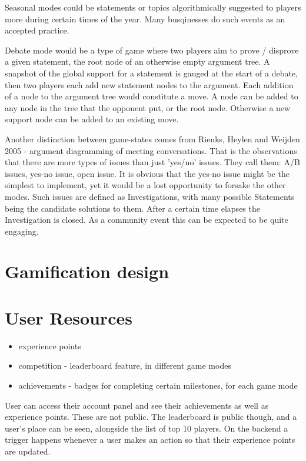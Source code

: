 \documentclass{article}
\begin{document}
Seasonal modes could be statements or topics algorithmically suggested to players more during certain times of the year. Many busqinesses do such events as an accepted practice.

Debate mode would be a type of game where two players aim to prove / disprove a given statement, the root node of an otherwise empty argument tree.  A snapshot of the global support for a statement is gauged at the start of a debate, then two players each add new statement nodes to the argument. Each addition of a node to the argument tree would constitute a move.
A node can be added to any node in the tree that the opponent put, or the root node. Otherwise a new support node can be added to an existing move.

Another distinction between game-states comes from Rienks, Heylen and Weijden 2005 - argument diagramming of meeting conversations. That is the observations that there are more types of issues than just 'yes/no' issues. They call them: A/B issues, yes-no issue, open issue. It is obvious that the yes-no issue might be the simplest to implement, yet it would be a lost opportunity to forsake the other modes.
Such issues are defined as Investigations, with many possible Statements being the candidate solutions to them. After a certain time elapses the Investigation is closed. As a community event this can be expected to be quite engaging.

\section{Gamification design}

\section{User Resources}
\begin{itemize}
  \item experience points 
  \item competition - leaderboard feature, in different game modes
  \item achievements - badges for completing certain milestones, for each game mode
\end{itemize}

User can access their account panel and see their achievements as well as experience points. These are not public. The leaderboard is public though, and a user's place can be seen, alongside the list of top 10 players. On the backend a trigger happens whenever a user makes an action so that their experience points are updated.
\end{document}
